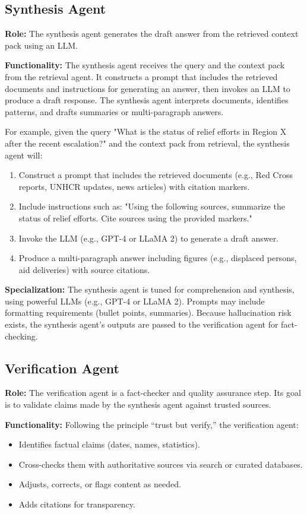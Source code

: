 \subsection{Synthesis Agent}
\textbf{Role:} The synthesis agent generates the draft answer from the retrieved context pack using an LLM.  

\textbf{Functionality:} The synthesis agent receives the query and the context pack from the retrieval agent. It constructs a prompt that includes the retrieved documents and instructions for generating an answer, then invokes an LLM to produce a draft response. The synthesis agent interprets documents, identifies patterns, and drafts summaries or multi-paragraph answers.  

For example, given the query "What is the status of relief efforts in Region X after the recent escalation?" and the context pack from retrieval, the synthesis agent will:  
\begin{enumerate}
    \item Construct a prompt that includes the retrieved documents (e.g., Red Cross reports, UNHCR updates, news articles) with citation markers.  
    \item Include instructions such as: "Using the following sources, summarize the status of relief efforts. Cite sources using the provided markers."  
    \item Invoke the LLM (e.g., GPT-4 or LLaMA 2) to generate a draft answer.  
    \item Produce a multi-paragraph answer including figures (e.g., displaced persons, aid deliveries) with source citations.  
\end{enumerate}  

\textbf{Specialization:} The synthesis agent is tuned for comprehension and synthesis, using powerful LLMs (e.g., GPT-4 or LLaMA 2). Prompts may include formatting requirements (bullet points, summaries). Because hallucination risk exists, the synthesis agent's outputs are passed to the verification agent for fact-checking.  

\subsection{Verification Agent}
\textbf{Role:} The verification agent is a fact-checker and quality assurance step. Its goal is to validate claims made by the synthesis agent against trusted sources.  

\textbf{Functionality:} Following the principle “trust but verify,” the verification agent:  
\begin{itemize}
    \item Identifies factual claims (dates, names, statistics).  
    \item Cross-checks them with authoritative sources via search or curated databases.  
    \item Adjusts, corrects, or flags content as needed.  
    \item Adds citations for transparency.  
\end{itemize}  

